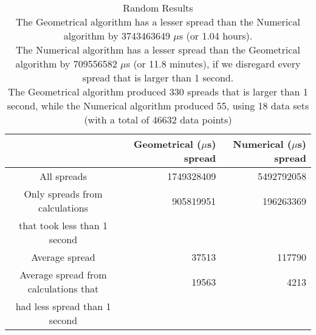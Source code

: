 \begin{table}[bth!]\footnotesize
 \begin{tabular}[3]{c|r|r}
 & Geometrical ($\mu$s) spread & Numerical ($\mu$s) spread\\
\hline
All spreads & 1749328409 & 5492792058 \\ 
\hline 
Only spreads from calculations & 905819951 & 196263369 \\ 
that took less than 1 second & & \\ 
\hline
Average spread & 37513 & 117790 \\
\hline
Average spread from calculations that & 19563 & 4213 \\ 
had less spread than 1 second & & \\ 
\end{tabular}\\ \\
\caption{Random  Results\\
The Geometrical algorithm has a lesser spread than the Numerical algorithm by 3743463649 $\mu$s (or 1.04 hours).\\
The Numerical algorithm has a lesser spread than the Geometrical algorithm by 709556582 $\mu$s (or 11.8 minutes), if we disregard every spread that is larger than 1 second.\\
The Geometrical algorithm produced 330 spreads that is larger than 1 second, while the Numerical algorithm produced 55, using 18 data sets (with a total of 46632 data points)\\
}\label{total-random_spreadtable}\end{table}